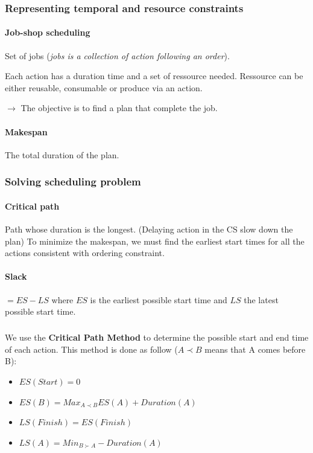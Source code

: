 \subsubsection{Representing temporal and resource constraints}

\paragraph{Job-shop scheduling} 

Set  of  jobs (\textit{jobs  is  a  collection  of action  following  an
order}). 

Each action has a duration  time and a set of ressource needed.
Ressource can  be either reusable,  consumable or produce via  an action.

$\to$ The objective is to find a plan that complete the job.

\paragraph{Makespan} The total duration of the plan.

\subsubsection{Solving scheduling problem}

\paragraph{Critical path} Path whose  duration is the longest. (Delaying
action in the CS  slow down the plan) To minimize  the makespan, we must
find  the earliest  start  times  for all  the  actions consistent  with
ordering constraint.

\paragraph{Slack} $= ES - LS$ where $ES$ is the earliest  possible start time
and $LS$ the latest possible start time.

\subparagraph{ } We  use the \textbf{Critical Path  Method} to determine
the possible start and  end time of each action. This  method is done as
follow ($A\prec B$ means that A comes before B):
	\begin{itemize}
		\item $ES(Start) = 0$
		\item $ES(B)=Max_{A\prec B}ES(A)+Duration(A)$
		\item $LS(Finish)=ES(Finish)$
		\item $LS(A)=Min_{B\succ A}-Duration(A)$
	\end{itemize}

